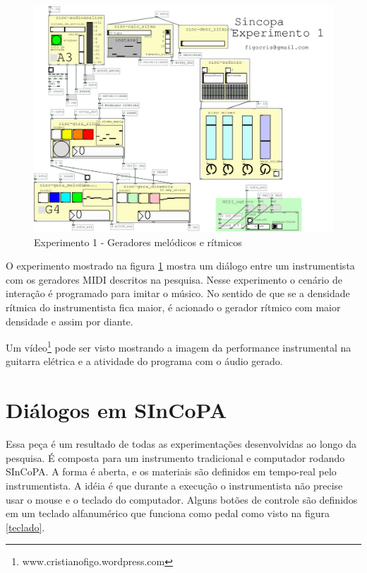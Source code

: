 \documentclass{ppgmus}
\begin{document}
\begin{figure}
\includegraphics[scale=.6]{experimento1}
\caption{Experimento 1 - Geradores melódicos e rítmicos}
\label{experimento1}
\end{figure}


O experimento mostrado na figura \ref{experimento1} mostra um diálogo
entre um instrumentista com os geradores MIDI descritos na pesquisa.
Nesse experimento o cenário de interação é programado para imitar
o músico. No sentido de que se a densidade rítmica do instrumentista fica maior,
é acionado o gerador rítmico com maior densidade e assim por diante.

Um vídeo\footnote{www.cristianofigo.wordpress.com} pode ser visto mostrando a imagem da performance instrumental
na guitarra elétrica e a atividade do programa com o áudio gerado.



\section{Diálogos em SInCoPA}
\label{chap:dialogos}

Essa peça é um resultado de todas as experimentações desenvolvidas ao longo da pesquisa. É
composta para um instrumento tradicional e computador rodando SInCoPA. A forma é aberta,
e os materiais são definidos em tempo-real pelo instrumentista. A idéia é que durante a
execução o instrumentista não precise usar o mouse e o teclado do 
computador. Alguns botões de controle são definidos em um teclado alfanumérico que funciona como
pedal como visto na figura \ref{teclado}.
\end{document}

